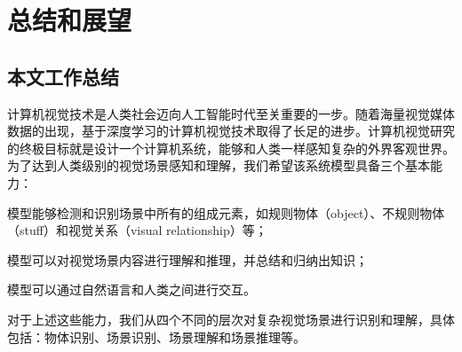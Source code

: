 \chapter{总结和展望}

\section{本文工作总结}

计算机视觉技术是人类社会迈向人工智能时代至关重要的一步。随着海量视觉媒体数据的出现，基于深度学习的计算机视觉技术取得了长足的进步。计算机视觉研究的终极目标就是设计一个计算机系统，能够和人类一样感知复杂的外界客观世界。为了达到人类级别的视觉场景感知和理解，我们希望该系统模型具备三个基本能力：
\begin{asparaenum}
\item 模型能够检测和识别场景中所有的组成元素，如规则物体（object）、不规则物体（stuff）和视觉关系（visual relationship）等；

\item 模型可以对视觉场景内容进行理解和推理，并总结和归纳出知识；

\item 模型可以通过自然语言和人类之间进行交互。
\end{asparaenum}

对于上述这些能力，我们从四个不同的层次对复杂视觉场景进行识别和理解，具体包括：物体识别、场景识别、场景理解和场景推理等。

